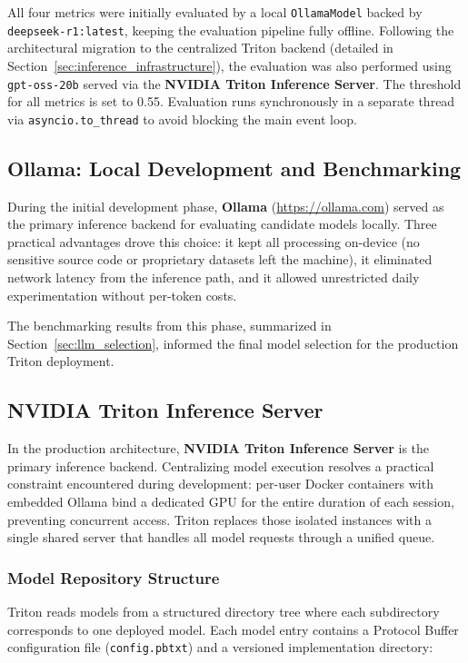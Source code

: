 All four metrics were initially evaluated by a local \texttt{OllamaModel} backed by \texttt{deepseek-r1:latest}, keeping the evaluation pipeline fully offline. Following the architectural migration to the centralized Triton backend (detailed in Section~\ref{sec:inference_infrastructure}), the evaluation was also performed using \texttt{gpt-oss-20b} served via the \textbf{NVIDIA Triton Inference Server}. The threshold for all metrics is set to 0.55. Evaluation runs synchronously in a separate thread via \texttt{asyncio.to\_thread} to avoid blocking the main event loop.

\subsection{Ollama: Local Development and Benchmarking}

During the initial development phase, \textbf{Ollama} (\url{https://ollama.com}) served as the primary inference backend for evaluating candidate models locally. Three practical advantages drove this choice: it kept all processing on-device (no sensitive source code or proprietary datasets left the machine), it eliminated network latency from the inference path, and it allowed unrestricted daily experimentation without per-token costs.

The benchmarking results from this phase, summarized in Section~\ref{sec:llm_selection}, informed the final model selection for the production Triton deployment.

\subsection{NVIDIA Triton Inference Server}

In the production architecture, \textbf{NVIDIA Triton Inference Server} is the primary inference backend. Centralizing model execution resolves a practical constraint encountered during development: per-user Docker containers with embedded Ollama bind a dedicated GPU for the entire duration of each session, preventing concurrent access. Triton replaces those isolated instances with a single shared server that handles all model requests through a unified queue.

\subsubsection{Model Repository Structure}

Triton reads models from a structured directory tree where each subdirectory corresponds to one deployed model. Each model entry contains a Protocol Buffer configuration file (\texttt{config.pbtxt}) and a versioned implementation directory:

